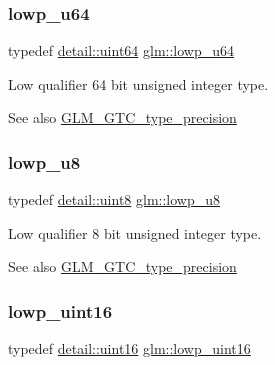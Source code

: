 \subsubsection{\texorpdfstring{lowp\+\_\+u64}{lowp\_u64}}
{\footnotesize\ttfamily typedef \hyperlink{namespaceglm_1_1detail_adec4b19bf4982125e122db2fe03c5810}{detail\+::uint64} \hyperlink{group__gtc__type__precision_ga61ed4c68a4cffb77cd63cc107119123a}{glm\+::lowp\+\_\+u64}}

Low qualifier 64 bit unsigned integer type. \begin{DoxySeeAlso}{See also}
\hyperlink{group__gtc__type__precision}{G\+L\+M\+\_\+\+G\+T\+C\+\_\+type\+\_\+precision} 
\end{DoxySeeAlso}
\mbox{\label{group__gtc__type__precision_gae63f942c49a30dbf266b2f13f3efe257}} 
\subsubsection{\texorpdfstring{lowp\+\_\+u8}{lowp\_u8}}
{\footnotesize\ttfamily typedef \hyperlink{namespaceglm_1_1detail_aef2588f97d090cc19fbbe0c74fe17c8f}{detail\+::uint8} \hyperlink{group__gtc__type__precision_gae63f942c49a30dbf266b2f13f3efe257}{glm\+::lowp\+\_\+u8}}

Low qualifier 8 bit unsigned integer type. \begin{DoxySeeAlso}{See also}
\hyperlink{group__gtc__type__precision}{G\+L\+M\+\_\+\+G\+T\+C\+\_\+type\+\_\+precision} 
\end{DoxySeeAlso}
\mbox{\label{group__gtc__type__precision_ga9b8409887319f62f06e664f6ca121b9d}} 
\subsubsection{\texorpdfstring{lowp\+\_\+uint16}{lowp\_uint16}}
{\footnotesize\ttfamily typedef \hyperlink{namespaceglm_1_1detail_a47b2a7d006d187338e8031a352d1ce56}{detail\+::uint16} \hyperlink{group__gtc__type__precision_ga9b8409887319f62f06e664f6ca121b9d}{glm\+::lowp\+\_\+uint16}}

